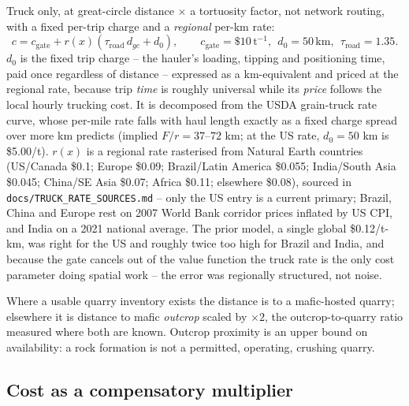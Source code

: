 \documentclass[11pt,a4paper]{article}
\begin{document}
Truck only, at great-circle distance $\times$ a tortuosity factor, not network
routing, with a fixed per-trip charge and a \emph{regional} per-km rate:
\begin{equation}
c = c_{\mathrm{gate}} + r(x)\left(\tau_{\mathrm{road}}\, d_{gc} + d_0\right),
\qquad
c_{\mathrm{gate}} = \$10\,\mathrm{t^{-1}},\ \
d_0 = 50\,\mathrm{km},\ \
\tau_{\mathrm{road}} = 1.35 .
\end{equation}
$d_0$ is the fixed trip charge -- the hauler's loading, tipping and positioning
time, paid once regardless of distance -- expressed as a km-equivalent and priced
at the regional rate, because trip \emph{time} is roughly universal while its
\emph{price} follows the local hourly trucking cost. It is decomposed from the
USDA grain-truck rate curve, whose per-mile rate falls with haul length exactly
as a fixed charge spread over more km predicts (implied $F/r = 37$--$72$ km;
at the US rate, $d_0 = 50$ km is \$5.00/t). $r(x)$ is a
regional rate rasterised from Natural Earth countries
(US/Canada \$0.1; Europe \$0.09; Brazil/Latin America \$0.055; India/South Asia \$0.045; China/SE Asia \$0.07; Africa \$0.11; elsewhere \$0.08), sourced in
\texttt{docs/TRUCK\_RATE\_SOURCES.md} -- only the US entry is a current primary;
Brazil, China and Europe rest on 2007 World Bank corridor prices inflated by US
CPI, and India on a 2021 national average. The prior model, a single global
\$0.12/t-km, was right for the US and roughly twice too high
for Brazil and India, and because the gate cancels out of the value function the
truck rate is the only cost parameter doing spatial work -- the error was
regionally structured, not noise.

Where a usable quarry inventory exists the distance is to a mafic-hosted quarry;
elsewhere it is distance to mafic \emph{outcrop} scaled by
$\times2$, the outcrop-to-quarry ratio measured where
both are known. Outcrop proximity is an upper bound on availability: a rock
formation is not a permitted, operating, crushing quarry.

\subsection{Cost as a compensatory multiplier}
\end{document}
